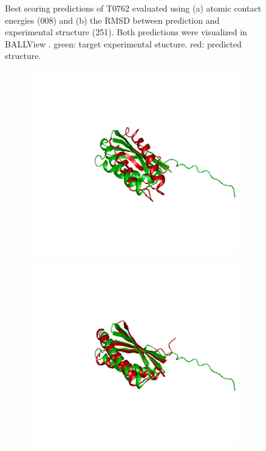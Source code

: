 \documentclass[11pt,a4paper]{article}
\renewcommand{\(}{\left (}
\renewcommand{\)}{\right )}
\begin{document}
\begin{figure}[!h]
\begin{subfigure}{.5\textwidth}
		\subcaption{}
	\end{subfigure}
	 \caption{Best scoring predictions of T0762 evaluated using (a) atomic contact energies (008) and (b) the RMSD between prediction and experimental structure (251). Both predictions were visualized in BALLView \citep{ballview}. green: target experimental stucture. red: predicted structure.}
\end{figure}

\begin{figure}[!h]
	\begin{subfigure}{.5\textwidth}
		\includegraphics[width=\textwidth]{figures/T0769TS442}
		\subcaption{}
	\end{subfigure}
	\begin{subfigure}{.5\textwidth}
		\includegraphics[width=\textwidth]{figures/T0769TS241}

\end{subfigure}
\end{figure}
\end{document}
